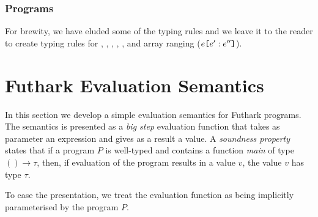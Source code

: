 \documentclass[oneside,11pt]{book}
\begin{document}



\subsubsection*{Programs }



For brewity, we have eluded some of the typing rules and we leave it
to the reader to create typing rules for , ,
, , , and array ranging
($e\texttt{[}e':e''\texttt{]}$).



\section{Futhark Evaluation Semantics}

In this section we develop a simple evaluation semantics for Futhark
programs. The semantics is presented as a \emph{big step} evaluation
function that takes as parameter an expression and gives as a result a
value. A \emph{soundness property} states that if a program $P$ is
well-typed and contains a function \emph{main} of type $() \rightarrow
\tau$, then, if evaluation of the program results in a value $v$, the
value $v$ has type $\tau$.

To ease the presentation, we treat the evaluation function as being
implicitly parameterised by the program $P$. %
\end{document}
